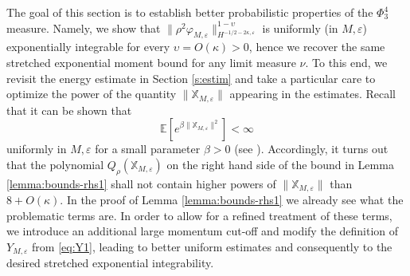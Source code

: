 \documentclass[a4paper,11pt]{article}
\numberwithin{equation}{section}
\begin{document}
The goal of this section is to establish better probabilistic properties of the $\Phi^{4}_{3}$ measure. Namely, we show that  $\| \rho^2 \varphi_{M,
\varepsilon} \|_{H^{- 1 / 2 - 2\kappa, \varepsilon}}^{1 - \upsilon}$ is uniformly (in $M,\varepsilon$)
exponentially integrable for every  $\upsilon=O(\kappa) > 0$, hence we recover the same stretched exponential moment bound for any limit measure $\nu$.
To this end, we revisit the energy estimate in Section \ref{s:estim} and take a particular care  to optimize the power of the quantity $\|\mathbb{X}_{M,\varepsilon}\|$ appearing in the estimates. 
Recall that it can be shown that
\begin{equation}
  \mathbb{E} [e^{\beta \| \mathbb{X}_{M, \varepsilon} \|^2}] < \infty
  \label{eq:exp-int}
\end{equation}
uniformly in $M, \varepsilon$ for a small parameter $\beta > 0$ (see
{\cite{moinat_space_time_2018}}). Accordingly, it turns out that the polynomial $Q_{\rho}(\mathbb X_{M,\varepsilon})$ on the right hand side of the bound in Lemma \ref{lemma:bounds-rhs1} shall not contain higher powers of $\|\mathbb X_{M,\varepsilon}\|$ than $8+O(\kappa)$. In the proof of Lemma \ref{lemma:bounds-rhs1} we already see what the problematic terms are. In order to allow for a refined treatment of these terms, we introduce an additional large momentum cut-off and modify the definition of $Y_{M,\varepsilon}$ from \eqref{eq:Y1}, leading to better uniform estimates and consequently to the desired stretched exponential integrability.
\end{document}
